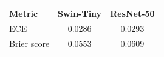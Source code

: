 \begin{tabular}{lcc}
\toprule
Metric & Swin-Tiny & ResNet-50\\
\midrule
ECE & 0.0286 & 0.0293\\
Brier score & 0.0553 & 0.0609\\
\bottomrule
\end{tabular}
